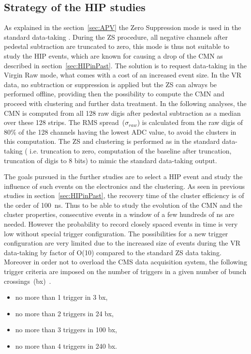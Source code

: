 \subsection{Strategy of the HIP studies}

As explained in the section~\ref{sec:APV} the Zero Suppression mode is used in the standard data-taking . During the ZS procedure, all negative channels after pedestal subtraction are truncated to zero, this mode is thus not suitable to study the HIP events, which are known for causing a drop of the CMN as described in section~\ref{sec:HIPinPast}. The solution is to request data-taking in the Virgin Raw mode, what comes with a cost of an increased event size. In the VR data, no subtraction or suppression is applied but the ZS can always be performed offline, providing then the possibility to compute the CMN and proceed with clustering and further data treatment. In the following analyses, the CMN is computed from all 128 raw digis after pedestal subtraction as a median over these 128 strips. The RMS spread~($\sigma_{raw}$) is calculated from the raw digis of 80\% of the 128 channels having the lowest ADC value, to avoid the clusters in this computation. The ZS and clustering is performed as in the standard data-taking ( i.e. truncation to zero, computation of the baseline after truncation, truncation of digis to 8 bits) to mimic the standard data-taking output.

The goals pursued in the further studies are to select a HIP event and study the influence of such events on the electronics and the clustering. As seen in previous studies in section~\ref{sec:HIPinPast}, the recovery time of the cluster efficiency is of the order of 100~ns. Thus to be able to study the evolution of the CMN and the cluster properties, consecutive events in a window of a few hundreds of ns are needed. However the probability to record closely spaced events in time is very low without special trigger configuration. The possibilities for a new trigger configuration are very limited due to the increased size of events during the VR data-taking by factor of O(10) compared to the standard ZS data taking. Moreover in order not to overload the CMS data acquisition system, the following trigger criteria are imposed on the number of triggers in a given number of bunch crossings~(bx)~\cite{website:VRtrigger}.

\begin{itemize}
\item{no more than 1 trigger in 3 bx,}
\item{no more than 2 triggers in 24 bx,}
\item{no more than 3 triggers in 100 bx,}
\item{no more than 4 triggers in 240 bx.}
\end{itemize}

